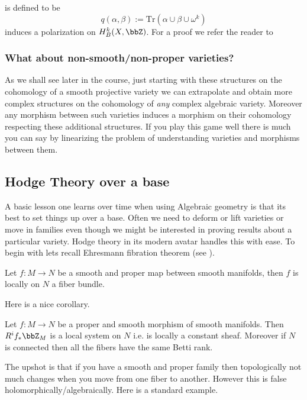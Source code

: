 \documentclass[a4paper,12pt]{book}
\begin{document}
\noindent is defined to be 
\[
q(\alpha,\beta):=\text{Tr}(\alpha \cup \beta \cup \omega^{k}) 
\]
\noindent induces a polarization on $H^{k}_{B}(X,\bbZ)$. For a proof we refer the reader to \cite[Theorem 6.32]{voisinHodgeTheory}

\subsubsection{What about non-smooth/non-proper varieties?}
\label{sec:non-smooth-nonproper}


As we shall see later in the course, just starting with these structures on the cohomology of a smooth projective variety we can extrapolate and obtain more complex structures on the cohomology of \textit{any} complex algebraic variety. Moreover any morphism between such varieties induces a morphism on their cohomology respecting these additional structures. If you play this game well there is much you can say by linearizing the problem of understanding varieties and morphisms between them.

\subsection{Hodge Theory over a base}
\label{sec:Hodge-Theory-base}

A basic lesson one learns over time when using Algebraic geometry is that its best to set things up over a base. Often we need to deform or lift varieties or move in families even though we might be interested in proving results about a particular variety. Hodge theory in its modern avatar handles this with ease. To begin with lets recall Ehresmann fibration theorem (see \cite[Theorem 9.3]{voisinHodgeTheory}). 

\begin{thm}\label{thm:ehresmann}
Let $f : M \to N$ be a smooth and proper map between smooth manifolds, then $f$ is locally on $N$ a fiber bundle.
\end{thm}

Here is a nice corollary.

\begin{cor}\label{cor:betti-cohomology-constant}
Let $f : M \to N$ be a proper and smooth morphism of smooth manifolds. Then $R^{i}f_{*}\bbZ_{M}$ is a local system on $N$ i.e. is locally a constant sheaf. Moreover if $N$ is connected then all the fibers have the same Betti rank. 
\end{cor}


The upshot is that if you have a smooth and proper family then topologically not much changes when you move from one fiber to another. However this is false holomorphically/algebraically. Here is a standard example.
\end{document}
